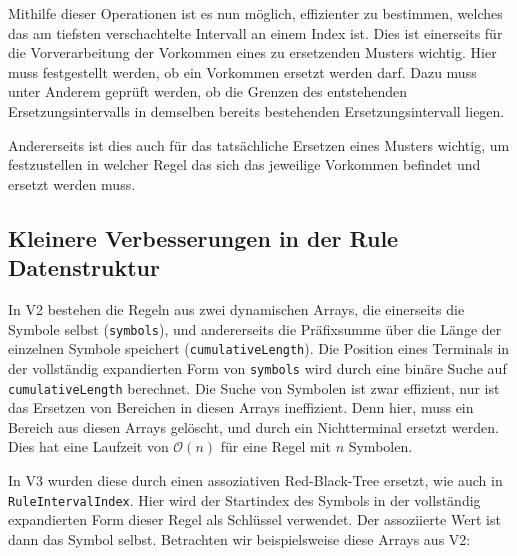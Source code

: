 































Mithilfe dieser Operationen ist es nun möglich, effizienter zu bestimmen, welches das am tiefsten verschachtelte Intervall an einem Index ist. Dies ist einerseits für die Vorverarbeitung der Vorkommen eines zu ersetzenden Musters wichtig. Hier muss festgestellt werden, ob ein Vorkommen ersetzt werden darf. Dazu muss unter Anderem geprüft werden, ob die Grenzen des entstehenden Ersetzungsintervalls in demselben bereits bestehenden Ersetzungsintervall liegen. 

Andererseits ist dies auch für das tatsächliche Ersetzen eines Musters wichtig, um festzustellen in welcher Regel das sich das jeweilige Vorkommen befindet und ersetzt werden muss.

\subsection{Kleinere Verbesserungen in der Rule Datenstruktur}

In V2 bestehen die Regeln aus zwei dynamischen Arrays, die einerseits die Symbole selbst (\texttt{symbols}), und andererseits die Präfixsumme über die Länge der einzelnen Symbole speichert (\texttt{cumulativeLength}).
Die Position eines Terminals in der vollständig expandierten Form von \texttt{symbols} wird durch eine binäre Suche auf \texttt{cumulativeLength} berechnet. Die Suche von Symbolen ist zwar effizient, nur ist das Ersetzen von Bereichen in diesen Arrays ineffizient. Denn hier, muss ein Bereich aus diesen Arrays gelöscht, und durch ein Nichtterminal ersetzt werden. Dies hat eine Laufzeit von $\mathcal{O}(n)$ für eine Regel mit $n$ Symbolen.

In V3 wurden diese durch einen assoziativen Red-Black-Tree ersetzt, wie auch in \texttt{RuleIntervalIndex}. Hier wird der Startindex des Symbols in der vollständig expandierten Form dieser Regel als Schlüssel verwendet. Der assoziierte Wert ist dann das Symbol selbst. Betrachten wir beispielsweise diese Arrays aus V2:

